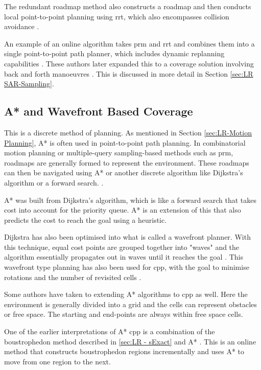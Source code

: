 The redundant roadmap method also constructs a roadmap and then conducts local point-to-point planning using \ac{rrt}, which also encompasses collision avoidance \cite{Englot2011}. 

An example of an online algorithm takes \ac{prm} and \ac{rrt} and combines them into a single point-to-point path planner, which includes dynamic replanning capabilities \cite{Wzorek2006}. These authors later expanded this to a coverage solution involving back and forth manoeuvres \cite{Rudol2008}. This is discussed in more detail in Section \ref{sec:LR SAR-Sampling}.
\subsection{A* and Wavefront Based Coverage}
\label{sec:LR - sA*}
This is a discrete method of planning. As mentioned in Section \ref{sec:LR-Motion Planning}, A* is often used in point-to-point path planning. In combinatorial motion planning or multiple-query sampling-based methods such as \ac{prm}, roadmaps are generally formed to represent the environment. These roadmaps can then be navigated using A* or another discrete algorithm like Dijkstra's algorithm or a forward search. \cite{Lavalle2006}.

A* was built from Dijkstra's algorithm, which is like a forward search that takes cost into account for the priority queue. A* is an extension of this that also predicts the cost to reach the goal using a heuristic. 

Dijkstra has also been optimised into what is called a wavefront planner. With this technique, equal cost points are grouped together into "waves" and the algorithm essentially propagates out in waves until it reaches the goal \cite{Lavalle2006}. This wavefront type planning has also been used for \ac{cpp}, with the goal to minimise rotations and the number of revisited cells \cite{Barrientos2011}.

Some authors have taken to extending A* algorithms to \ac{cpp} as well. Here the environment is generally divided into a grid and the cells can represent obstacles or free space. The starting and end-points are always within free space cells.

One of the earlier interpretations of A* \ac{cpp} is a combination of the boustrophedon method described in \ref{sec:LR - sExact} and A* \cite{Viet2012}. This is an online method that constructs boustrophedon regions incrementally and uses A* to move from one region to the next. 


